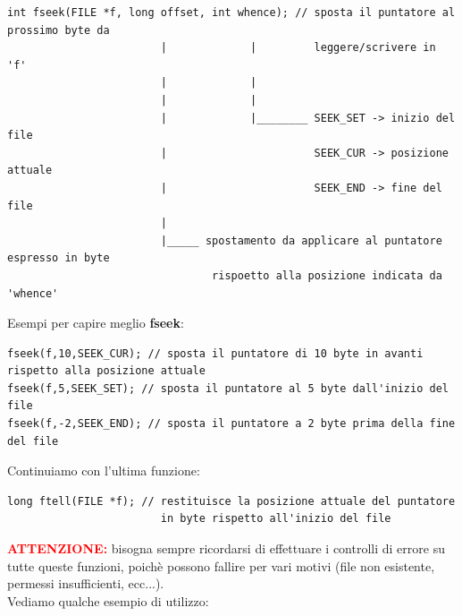 \begin{verbatim}
int fseek(FILE *f, long offset, int whence); // sposta il puntatore al prossimo byte da 
                        |             |         leggere/scrivere in 'f'
                        |             |   
                        |             |
                        |             |________ SEEK_SET -> inizio del file
                        |                       SEEK_CUR -> posizione attuale
                        |                       SEEK_END -> fine del file
                        |
                        |_____ spostamento da applicare al puntatore espresso in byte
                                rispoetto alla posizione indicata da 'whence'         
\end{verbatim}
Esempi per capire meglio \textbf{fseek}:
\begin{verbatim}
fseek(f,10,SEEK_CUR); // sposta il puntatore di 10 byte in avanti rispetto alla posizione attuale
fseek(f,5,SEEK_SET); // sposta il puntatore al 5 byte dall'inizio del file
fseek(f,-2,SEEK_END); // sposta il puntatore a 2 byte prima della fine del file
\end{verbatim}
Continuiamo con l'ultima funzione:
\begin{verbatim}
long ftell(FILE *f); // restituisce la posizione attuale del puntatore 
                        in byte rispetto all'inizio del file
\end{verbatim}
\textbf{\textcolor{red}{ATTENZIONE:}} bisogna sempre ricordarsi di effettuare i controlli di errore su tutte queste funzioni, 
poichè possono fallire per vari motivi (file non esistente, permessi insufficienti, ecc...).\\
Vediamo qualche esempio di utilizzo:
